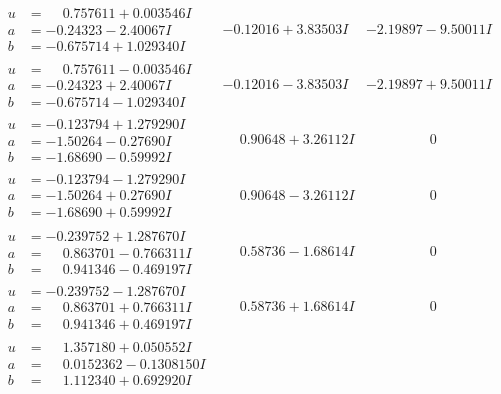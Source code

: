 \documentclass[1p]{elsarticle_modified}
\theoremstyle{definition}
\begin{document}
$$\begin{array}{c|c|c}
\begin{aligned}
u &= \phantom{-}0.757611 + 0.003546 I \\
a &= -0.24323 - 2.40067 I \\
b &= -0.675714 + 1.029340 I\end{aligned}
 & -0.12016 + 3.83503 I & -2.19897 - 9.50011 I \\ \hline\begin{aligned}
u &= \phantom{-}0.757611 - 0.003546 I \\
a &= -0.24323 + 2.40067 I \\
b &= -0.675714 - 1.029340 I\end{aligned}
 & -0.12016 - 3.83503 I & -2.19897 + 9.50011 I \\ \hline\begin{aligned}
u &= -0.123794 + 1.279290 I \\
a &= -1.50264 - 0.27690 I \\
b &= -1.68690 - 0.59992 I\end{aligned}
 & \phantom{-}0.90648 + 3.26112 I & \phantom{-0.000000 } 0 \\ \hline\begin{aligned}
u &= -0.123794 - 1.279290 I \\
a &= -1.50264 + 0.27690 I \\
b &= -1.68690 + 0.59992 I\end{aligned}
 & \phantom{-}0.90648 - 3.26112 I & \phantom{-0.000000 } 0 \\ \hline\begin{aligned}
u &= -0.239752 + 1.287670 I \\
a &= \phantom{-}0.863701 - 0.766311 I \\
b &= \phantom{-}0.941346 - 0.469197 I\end{aligned}
 & \phantom{-}0.58736 - 1.68614 I & \phantom{-0.000000 } 0 \\ \hline\begin{aligned}
u &= -0.239752 - 1.287670 I \\
a &= \phantom{-}0.863701 + 0.766311 I \\
b &= \phantom{-}0.941346 + 0.469197 I\end{aligned}
 & \phantom{-}0.58736 + 1.68614 I & \phantom{-0.000000 } 0 \\ \hline\begin{aligned}
u &= \phantom{-}1.357180 + 0.050552 I \\
a &= \phantom{-}0.0152362 - 0.1308150 I \\
b &= \phantom{-}1.112340 + 0.692920 I\end{aligned}

\end{array}$$
\end{document}
